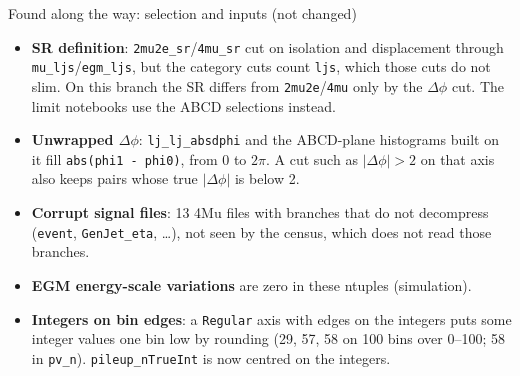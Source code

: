 \documentclass[aspectratio=169,11pt]{beamer}
\newcommand{\code}[1]{{\small\colorbox{codebg}{\texttt{#1}}}}
\begin{document}
\begin{frame}{Found along the way: selection and inputs (not changed)}\label{sl:sr}
  \begin{itemize}
    \item \textbf{SR definition}: \code{2mu2e\_sr}/\code{4mu\_sr} cut on isolation and displacement
          through \code{mu\_ljs}/\code{egm\_ljs}, but the category cuts count \code{ljs}, which those
          cuts do not slim. On this branch the SR differs from \code{2mu2e}/\code{4mu} only by the
          $\Delta\phi$ cut. The limit notebooks use the ABCD selections instead.
    \item \textbf{Unwrapped $\Delta\phi$}: \code{lj\_lj\_absdphi} and the ABCD-plane histograms
          built on it fill \code{abs(phi1 - phi0)}, from 0 to $2\pi$. A cut such as
          $|\Delta\phi|>2$ on that axis also keeps pairs whose true $|\Delta\phi|$ is below 2.
    \item \textbf{Corrupt signal files}: 13 4Mu files with branches that do not decompress
          (\code{event}, \code{GenJet\_eta}, \ldots), not seen by the census, which does not read those
          branches.
    \item \textbf{EGM energy-scale variations} are zero in these ntuples (simulation).
    \item \textbf{Integers on bin edges}: a \code{Regular} axis with edges on the integers puts some
          integer values one bin low by rounding (29, 57, 58 on 100 bins over 0--100; 58 in
          \code{pv\_n}). \code{pileup\_nTrueInt} is now centred on the integers.
  \end{itemize}
\end{frame}
\end{document}
